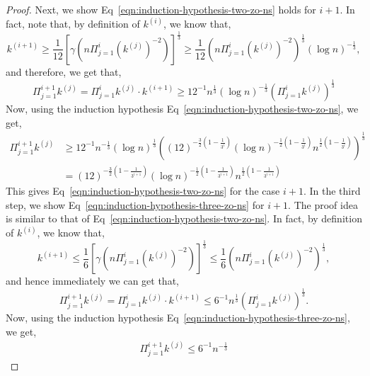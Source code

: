 \begin{proof}
Next, we show Eq~\eqref{eqn:induction-hypothesis-two-zo-ns} holds for $i+1$. 
In fact, note that, by definition of $k^{(i)}$, we know that, 
\begin{equation*}
 k^{(i+1)} \geq \frac{1}{12} \left[\gamma \left(n \Pi_{j=1}^i (k^{(j)})^{-2}\right)\right]^\frac{1}{3}
	\geq \frac{1}{12} \left(n \Pi_{j=1}^i (k^{(j)})^{-2}\right)^\frac{1}{3} (\log n)^{-\frac{1}{3}}, 
\end{equation*}
and therefore, we get that, 
\begin{equation*}
\Pi_{j=1}^{i+1} k^{(j)} = \Pi_{j=1}^{i} k^{(j)} \cdot k^{(i+1)} 
	\geq 12^{-1} n^{\frac{1}{3}}(\log n)^{-\frac{1}{3}}
	 \left(\Pi_{j=1}^i k^{(j)}\right)^\frac{1}{3} 
\end{equation*}
Now, using the induction hypothesis Eq~\eqref{eqn:induction-hypothesis-two-zo-ns}, 
we get, 
\begin{align*}
\Pi_{j=1}^{i+1} k^{(j)}&\geq 12^{-1} n^{-\frac{1}{3}}(\log n)^\frac{1}{3}
	 \left(\left(12\right)^{-\frac{3}{2}\left(1-\frac{1}{3^i}\right)}
		(\log n)^{-\frac{1}{2}\left(1-\frac{1}{3^i}\right)} 
			n^{\frac{1}{2}\left(1-\frac{1}{3^i}\right)} \right)^\frac{1}{3}\\
	&= \left(12\right)^{-\frac{3}{2}\left(1-\frac{1}{3^{i+1}}\right)}
		(\log n)^{-\frac{1}{2}\left(1-\frac{1}{3^{i+1}}\right)} 
			n^{\frac{1}{2}\left(1-\frac{1}{3^{i+1}}\right)} 
\end{align*}
This gives Eq~\eqref{eqn:induction-hypothesis-two-zo-ns} for the case $i+1$. 
In the third step, we show Eq~\eqref{eqn:induction-hypothesis-three-zo-ns}
for $i+1$. The proof idea is similar to that of Eq~\eqref{eqn:induction-hypothesis-two-zo-ns}.
In fact, by definition of $k^{(i)}$, we know that, 
\begin{equation*}
 k^{(i+1)} \leq \frac{1}{6} \left[\gamma \left(n \Pi_{j=1}^i (k^{(j)})^{-2}\right)\right]^\frac{1}{3}
	\leq \frac{1}{6} \left(n \Pi_{j=1}^i (k^{(j)})^{-2}\right)^\frac{1}{3}, 
\end{equation*}
and hence immediately we can get that, 
\begin{equation*}
\Pi_{j=1}^{i+1} k^{(j)} = \Pi_{j=1}^{i} k^{(j)} \cdot k^{(i+1)} 
	\leq 6^{-1} n^{\frac{1}{3}} \left(\Pi_{j=1}^i k^{(j)}\right)^\frac{1}{3}.
\end{equation*}
Now, using the induction hypothesis Eq~\eqref{eqn:induction-hypothesis-three-zo-ns}, 
we get, 
\begin{align*}
\Pi_{j=1}^{i+1} k^{(j)}\leq 6^{-1} n^{-\frac{1}{3}}

\end{align*}
\end{proof}
